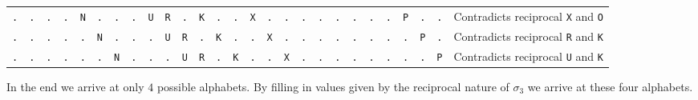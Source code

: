 \begin{center}
{\begin{tabular}{|*{26}{c|}l|}
			\texttt{.} & \texttt{.} & \texttt{.} & \texttt{.} & \texttt{N} & \texttt{.} & \texttt{.} & \texttt{.} & \texttt{U} & \texttt{R} & \texttt{.} & \texttt{K} & \texttt{.} & \texttt{.} & \texttt{X} & \texttt{.} & \texttt{.} & \texttt{.} & \texttt{.} & \texttt{.} & \texttt{.} & \texttt{.} & \texttt{.} & \texttt{P} & \texttt{.} & \texttt{.} & \;\;Contradicts reciprocal \texttt{X} and \texttt{O} \\
			\texttt{.} & \texttt{.} & \texttt{.} & \texttt{.} & \texttt{.} & \texttt{N} & \texttt{.} & \texttt{.} & \texttt{.} & \texttt{U} & \texttt{R} & \texttt{.} & \texttt{K} & \texttt{.} & \texttt{.} & \texttt{X} & \texttt{.} & \texttt{.} & \texttt{.} & \texttt{.} & \texttt{.} & \texttt{.} & \texttt{.} & \texttt{.} & \texttt{P} & \texttt{.} & \;\;Contradicts reciprocal \texttt{R} and \texttt{K} \\
			\texttt{.} & \texttt{.} & \texttt{.} & \texttt{.} & \texttt{.} & \texttt{.} & \texttt{N} & \texttt{.} & \texttt{.} & \texttt{.} & \texttt{U} & \texttt{R} & \texttt{.} & \texttt{K} & \texttt{.} & \texttt{.} & \texttt{X} & \texttt{.} & \texttt{.} & \texttt{.} & \texttt{.} & \texttt{.} & \texttt{.} & \texttt{.} & \texttt{.} & \texttt{P} & \;\;Contradicts reciprocal \texttt{U} and \texttt{K} \\
			\hline
		\end{tabular}}
\end{center}
\noindent In the end we arrive at only $4$ possible alphabets. By filling in values given by the reciprocal nature of $\sigma_3$ we arrive at these four alphabets.
\setlength{\tabcolsep}{3pt}
\renewcommand{\arraystretch}{1.1}


